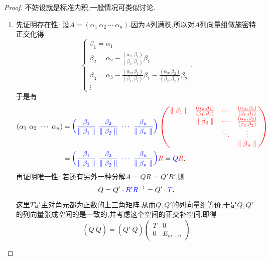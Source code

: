 \documentclass[../../main.tex]{subfiles}%
\begin{document}
\begin{proof}

不妨设就是标准内积,一般情况可类似讨论.
\begin{enumerate}
\item 先证明存在性: 设\( A = (\alpha_1\ \alpha_2\ \cdots\ \alpha_n) \).因为\( A \)列满秩,所以对\( A \)列向量组做施密特正交化得
\[
\begin{cases}
\beta_1 = \alpha_1 \\
\beta_2 = \alpha_2 - \frac{(\alpha_2, \beta_1)}{(\beta_1, \beta_1)} \beta_1 \\
\beta_3 = \alpha_3 - \frac{(\alpha_3, \beta_1)}{(\beta_1, \beta_1)} \beta_1 - \frac{(\alpha_3, \beta_2)}{(\beta_2, \beta_2)} \beta_2 \\
\vdots
\end{cases}.
\]
于是有
\begin{align*}
(\alpha _1\,\,\alpha _2\,\,\cdots \,\,\alpha _n)&={\color{blue} \left( \frac{\beta _1}{\parallel \beta _1\parallel}\,\,\frac{\beta _2}{\parallel \beta _2\parallel}\,\,\cdots \,\,\frac{\beta _n}{\parallel \beta _n\parallel} \right) {\color{red} \left( \begin{matrix}
\parallel \beta _1\parallel&		\frac{\left( \alpha _2,\beta _1 \right)}{\left( \beta _1,\beta _1 \right)}&		\cdots&		\frac{\left( \alpha _n,\beta _1 \right)}{\left( \beta _1,\beta _1 \right)}\\
&		\parallel \beta _2\parallel&		\cdots&		\frac{\left( \alpha _n,\beta _2 \right)}{\left( \beta _2,\beta _2 \right)}\\
&		&		\ddots&		\vdots\\
&		&		&		\parallel \beta _n\parallel\\
\end{matrix} \right)}}
\\
&={\color{blue} \left( \frac{\beta _1}{\parallel \beta _1\parallel}\,\,\frac{\beta _2}{\parallel \beta _2\parallel}\,\,\cdots \,\,\frac{\beta _n}{\parallel \beta _n\parallel} \right) }{\color{red} R}={\color{blue} Q}{\color{red} R}.
\end{align*}
再证明唯一性: 若还有另外一种分解\( A = QR = Q' R' \),则
\[
Q = Q' \cdot {\color{blue} R' R^{-1}} = Q' \cdot {\color{blue} T},
\]
这里\( T \)是主对角元都为正数的上三角矩阵.从而\( Q, Q' \)的列向量组等价,于是\( Q, Q' \)的列向量张成空间的是一致的,并考虑这个空间的正交补空间,即得
\[
(Q\ \widetilde{Q}) = (Q'\ \widetilde{Q}) \begin{pmatrix} T & 0 \\ 0 & E_{m - n} \end{pmatrix}
\]
\end{enumerate}
\end{proof}
\end{document}
